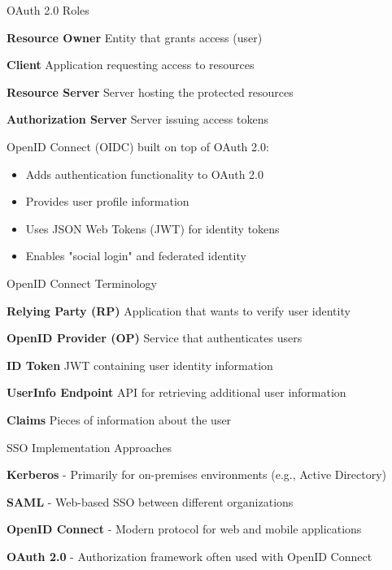 \begin{concept}{OAuth 2.0 Roles}

    \textbf{Resource Owner} Entity that grants access (user)

    \textbf{Client} Application requesting access to resources

    \textbf{Resource Server} Server hosting the protected resources

    \textbf{Authorization Server} Server issuing access tokens

\end{concept}

\begin{definition}{OpenID Connect (OIDC)}
    built on top of OAuth 2.0:
\begin{itemize}
    \item Adds authentication functionality to OAuth 2.0
    \item Provides user profile information
    \item Uses JSON Web Tokens (JWT) for identity tokens
    \item Enables "social login" and federated identity
\end{itemize}
\end{definition}

\begin{concept}{OpenID Connect Terminology}

    \textbf{Relying Party (RP)} Application that wants to verify user identity

    \textbf{OpenID Provider (OP)} Service that authenticates users

    \textbf{ID Token} JWT containing user identity information

    \textbf{UserInfo Endpoint} API for retrieving additional user information

    \textbf{Claims} Pieces of information about the user

\end{concept}


\begin{concept}{SSO Implementation Approaches}

    \textbf{Kerberos} - Primarily for on-premises environments (e.g., Active Directory)

    \textbf{SAML} - Web-based SSO between different organizations

    \textbf{OpenID Connect} - Modern protocol for web and mobile applications

    \textbf{OAuth 2.0} - Authorization framework often used with OpenID Connect

\end{concept}


